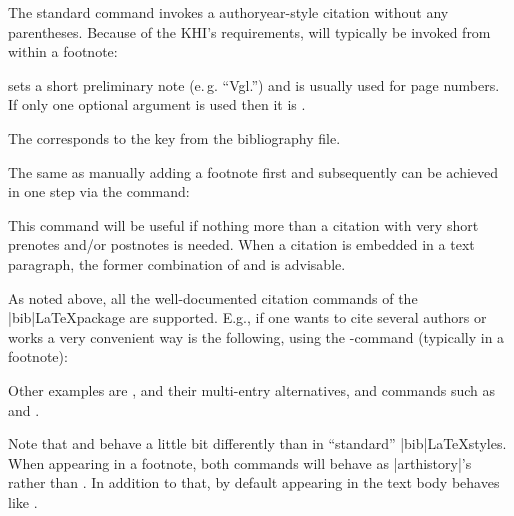 \documentclass[a4paper,
10pt,
ngerman,
english
]{ltxdoc}
\begin{document}
\DescribeMacro{\cite}%
The standard  command invokes a authoryear-style citation without any parentheses. Because of the KHI's requirements,  will typically be invoked from within a footnote:

 sets a short preliminary note (e.\,g. \enquote{Vgl.}) and  is usually used for page numbers.
If only one optional argument is used then it is .
The  corresponds to the key from the bibliography file.

\DescribeMacro{\footcite}
The same as manually adding a footnote first and  subsequently can be achieved in one step via the  command:
This command will be useful if nothing more than a citation with very short prenotes and/or postnotes is needed. When a citation is embedded in a text paragraph, the former combination of  and  is advisable.

As noted above, all the well-documented citation commands of the |bib|\LaTeX package are supported.
\DescribeMacro{\cites}
E.g., if one wants to cite several authors or works a very convenient way is the following, using the -command (typically in a footnote):
Other examples are , and their multi-entry alternatives, and commands such as  and .

Note that  and  behave a little bit differently than in \enquote{standard} |bib|\LaTeX styles. When appearing in a footnote, both commands will behave as |arthistory|'s  rather than . In addition to that, by default  appearing in the text body behaves like .
\end{document}
